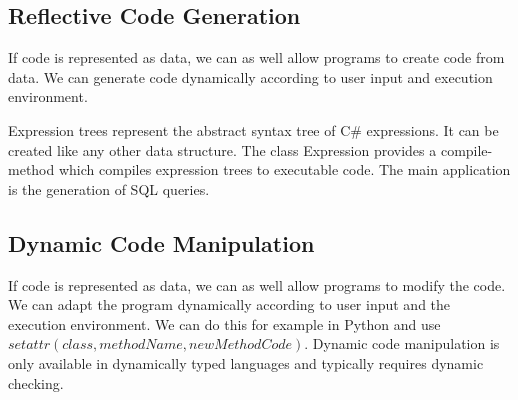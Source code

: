 \subsection{Reflective Code Generation}
\begin{mytitle}[Motivation] If code is represented as data, we can as well allow programs to create code from data. We can generate code dynamically according to user input and execution environment. 
\end{mytitle}
\begin{mytitle} Expression trees represent the abstract syntax tree of C\# expressions. It can be created like any other data structure. The class Expression provides a compile-method which compiles expression trees to executable code. The main application is the generation of SQL queries.
\end{mytitle}

\subsection{Dynamic Code Manipulation}
\begin{mytitle}[Motivation] If code is represented as data, we can as well allow programs to modify the code. We can adapt the program dynamically according to user input and the execution environment. We can do this for example in Python and use $setattr(class, methodName, newMethodCode)$. Dynamic code manipulation is only available in dynamically typed languages and typically requires dynamic checking.
\end{mytitle}